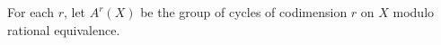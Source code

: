 For each $r$, let $A^r(X)$ be the group of cycles of codimension $r$ on $X$ modulo rational equivalence.
